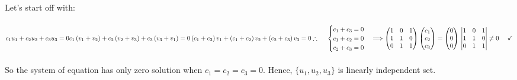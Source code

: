 \documentclass[fleqn]{article}
\begin{document}
\begin{enumerate}
      \textcolor{hwColor}{
        Let's start off with: \\
        \\
        $
          c_1u_1+c_2u_2+c_3u_3=0
          \\
          \\
          c_1\left(v_1+v_2\right)+c_2\left(v_2+v_3\right)+c_3\left(v_3+v_1\right)=0
          \\
          \\
          \left(c_1+c_3\right)v_1+\left(c_1+c_2\right)v_2+\left(c_2+c_3\right)v_3=0
          \\
          \\
          \\
          \therefore ~~~~ \begin{cases}
            c_1+c_3=0
            \\
            c_1+c_2=0
            \\
            c_2+c_3=0
          \end{cases} \Longrightarrow \begin{pmatrix}
            1 & 0 & 1
            \\
            1 & 1 & 0
            \\
            0 & 1 & 1
          \end{pmatrix} \begin{pmatrix}
            c_1
            \\
            c_2
            \\
            c_3
          \end{pmatrix}=\begin{pmatrix}
            0
            \\
            0
            \\
            0
          \end{pmatrix}
          \\
          \\
          \\
          \begin{vmatrix}
            1 & 0 & 1
            \\
            1 & 1 & 0
            \\
            0 & 1 & 1
          \end{vmatrix} \neq 0 ~~~~ \checkmark
        $
        \\
        \\
        So the system of equation has only zero solution when $c_1=c_2=c_3=0$. Hence, $\{u_1, u_2, u_3\}$
        is linearly independent set.
      }

  \end{enumerate}
\end{document}

